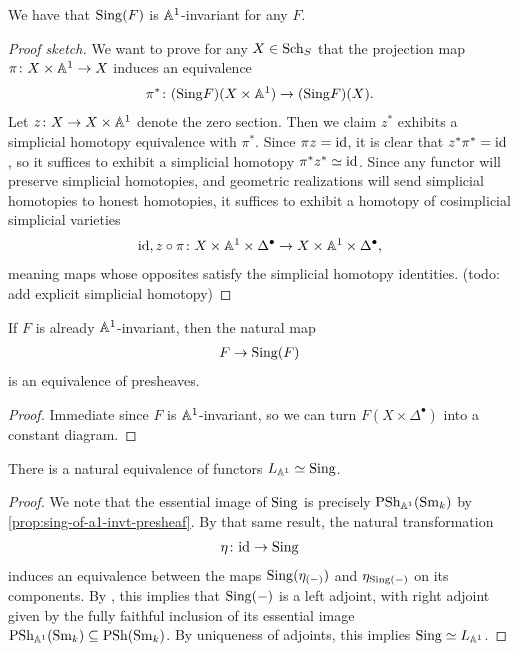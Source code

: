 \documentclass[11pt,openany]{book}
\renewcommand{\Pre}{\mathrm{PSh}}
\begin{document}
\begin{proposition} We have that $\mathrm{Sing}(F)$ is $\mathbb{A}^1$-invariant for any $F$.
\end{proposition}
\begin{proof}[Proof sketch]
We want to prove for any $X\in \mathrm{Sch}_S$ that the projection map $\pi \colon X \times \mathbb{A}^1 \to X$ induces an equivalence
\begin{align*}
    \pi^\ast \colon (\mathrm{Sing} F)(X \times \mathbb{A}^1) \to (\mathrm{Sing} F)(X).
\end{align*}
%
Let $z \colon X \to X \times \mathbb{A}^1$ denote the zero section. Then we claim $z^\ast$ exhibits a simplicial homotopy equivalence with $\pi^\ast$. Since $\pi z = \mathrm{id}$, it is clear that $z^\ast \pi^\ast = \mathrm{id}$, so it suffices to exhibit a simplicial homotopy $\pi^\ast z^\ast \simeq \mathrm{id}$. Since any functor will preserve simplicial homotopies, and geometric realizations will send simplicial homotopies to honest homotopies, it suffices to exhibit a homotopy of cosimplicial simplicial varieties
\begin{align*}
    \mathrm{id}, z\circ \pi \colon X \times \mathbb{A}^1 \times \Delta^\bullet \to X \times \mathbb{A}^1 \times \Delta^\bullet,
\end{align*}
meaning maps whose opposites satisfy the simplicial homotopy identities. (todo: add explicit simplicial homotopy)
\end{proof}

\begin{proposition}\label{prop:sing-of-a1-invt-presheaf} 
If $F$ is already $\mathbb{A}^1$-invariant, then the natural map
\begin{align*}
    F \to \mathrm{Sing}(F)
\end{align*}
is an equivalence of presheaves.
\end{proposition}
\begin{proof} Immediate since $F$ is $\mathbb{A}^1$-invariant, so we can turn $F(X \times \Delta^\bullet)$ into a constant diagram.
\end{proof}

\begin{proposition} There is a natural equivalence of functors $L_{\mathbb{A}^1} \simeq \mathrm{Sing}$.
\end{proposition}
\begin{proof}
We note that the essential image of $\mathrm{Sing}$ is precisely $\Pre_{\A^1}(\Sm_k)$ by \autoref{prop:sing-of-a1-invt-presheaf}. By that same result, the natural transformation
\begin{align*}
    \eta \colon \mathrm{id} \to \mathrm{Sing}
\end{align*}
induces an equivalence between the maps $\mathrm{Sing}(\eta_{(-)})$ and $\eta_{\mathrm{Sing}(-)}$ on its components. By \cite[5.2.7.4]{HTT}, this implies that $\mathrm{Sing}(-)$ is a left adjoint, with right adjoint given by the fully faithful inclusion of its essential image $\Pre_{\A^1}(\Sm_k) \subseteq \Pre(\Sm_k)$. By uniqueness of adjoints, this implies $\mathrm{Sing} \simeq L_{\mathbb{A}^1}$.
\end{proof}
\end{document}
